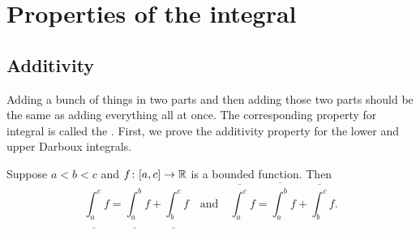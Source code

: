 
\sectionnewpage
\section{Properties of the integral}
\label{sec:rintprop}


\subsection{Additivity}

Adding a bunch of things in two parts and then adding those two parts
should be the same as adding everything all at once.
The corresponding property for integral is called the
.  First, we prove the additivity
property for the lower and upper Darboux integrals.

\begin{lemma} \label{lemma:darbouxadd}
Suppose $a < b < c$ and $f \colon [a,c] \to {\mathbb{R}}$ is a bounded function.
Then
\begin{equation*}
\underline{\int_a^c} f
=
\underline{\int_a^b} f
+
\underline{\int_b^c} f
\quad \text{and} \quad
\overline{\int_a^c} f
=
\overline{\int_a^b} f
+
\overline{\int_b^c} f .
\end{equation*}
\end{lemma}


